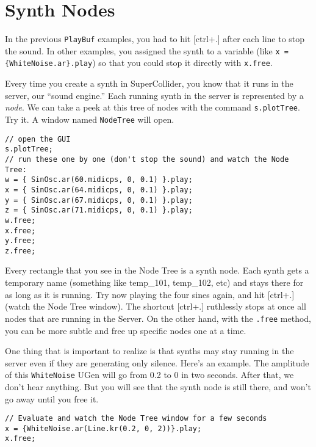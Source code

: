 \section{Synth Nodes}

In the previous \texttt{PlayBuf} examples, you had to hit [ctrl+.] after each line to stop the sound. In other examples, you assigned the synth to a variable (like \texttt{x = \{WhiteNoise.ar\}.play}) so that you could stop it directly with \texttt{x.free}.

Every time you create a synth in SuperCollider, you know that it runs in the server, our ``sound engine.'' Each running synth in the server is represented by a \emph{node}. We can take a peek at this tree of nodes with the command \texttt{s.plotTree}. Try it. A window named \texttt{NodeTree} will open.

 
\begin{lstlisting}[style=SuperCollider-IDE, basicstyle=\scttfamily\footnotesize]
// open the GUI
s.plotTree;
// run these one by one (don't stop the sound) and watch the Node Tree:
w = { SinOsc.ar(60.midicps, 0, 0.1) }.play;
x = { SinOsc.ar(64.midicps, 0, 0.1) }.play;
y = { SinOsc.ar(67.midicps, 0, 0.1) }.play;
z = { SinOsc.ar(71.midicps, 0, 0.1) }.play;
w.free;
x.free;
y.free;
z.free;
\end{lstlisting}
 

Every rectangle that you see in the Node Tree is a synth node. Each synth gets a temporary name (something like temp\_101, temp\_102, etc) and stays there for as long as it is running. Try now playing the four sines again, and hit [ctrl+.] (watch the Node Tree window). The shortcut [ctrl+.] ruthlessly stops at once all nodes that are running in the Server. On the other hand, with the \texttt{.free} method, you can be more subtle and free up specific nodes one at a time.

One thing that is important to realize is that synths may stay running in the server even if they are generating only silence. Here's an example. The amplitude of this \texttt{WhiteNoise} UGen will go from 0.2 to 0 in two seconds. After that, we don't hear anything. But you will see that the synth node is still there, and won't go away until you free it.

 
\begin{lstlisting}[style=SuperCollider-IDE, basicstyle=\scttfamily\footnotesize]
// Evaluate and watch the Node Tree window for a few seconds
x = {WhiteNoise.ar(Line.kr(0.2, 0, 2))}.play;
x.free;
\end{lstlisting}
 

